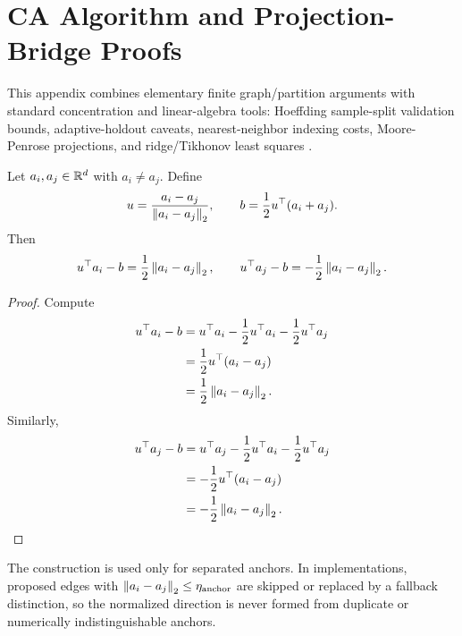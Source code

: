 \section{CA Algorithm and Projection-Bridge Proofs}
\label{app:algorithm-bridge-proofs}

This appendix combines elementary finite graph/partition arguments with standard concentration and linear-algebra tools: Hoeffding sample-split validation bounds, adaptive-holdout caveats, nearest-neighbor indexing costs, Moore-Penrose projections, and ridge/Tikhonov least squares \citep{hoeffding1963probability,devroye1996probabilistic,dwork2015reusable,dwork2015generalization,indyk1998approximate,johnson2019billion,penrose1955generalized,tikhonov1977solutions,hoerl1970ridge}.

\begin{theorem}
\label{thm:anchor-edge:formal}
Let $a_i,a_j\in\mathbb{R}^d$ with $a_i\ne a_j$. Define
\begin{align*}
u=\frac{a_i-a_j}{\left\lVert a_i-a_j\right\rVert_2},\qquad b=\frac{1}{2}u^\top(a_i+a_j).
\end{align*}
Then
\begin{align*}
u^\top a_i-b=\frac{1}{2}\left\lVert a_i-a_j\right\rVert_2,\qquad u^\top a_j-b=-\frac{1}{2}\left\lVert a_i-a_j\right\rVert_2.
\end{align*}
\end{theorem}
\begin{proof}
Compute
\begin{align*}
u^\top a_i-b&=u^\top a_i-\frac{1}{2}u^\top a_i-\frac{1}{2}u^\top a_j\\
&=\frac{1}{2}u^\top(a_i-a_j)\\
&=\frac{1}{2}\left\lVert a_i-a_j\right\rVert_2.
\end{align*}
Similarly,
\begin{align*}
u^\top a_j-b&=u^\top a_j-\frac{1}{2}u^\top a_i-\frac{1}{2}u^\top a_j\\
&=-\frac{1}{2}u^\top(a_i-a_j)\\
&=-\frac{1}{2}\left\lVert a_i-a_j\right\rVert_2.
\end{align*}
\end{proof}

The construction is used only for separated anchors. In implementations, proposed edges with $\left\lVert a_i-a_j\right\rVert_2\le\eta_{\mathrm{anchor}}$ are skipped or replaced by a fallback distinction, so the normalized direction is never formed from duplicate or numerically indistinguishable anchors.

